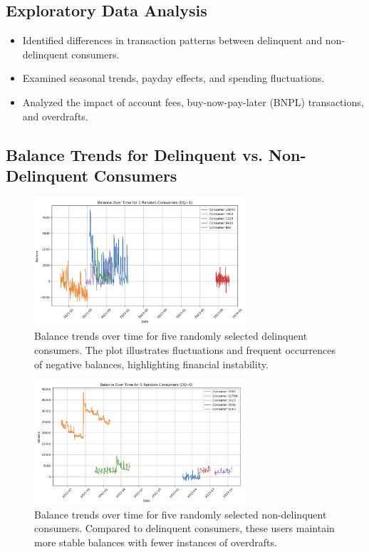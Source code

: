\documentclass[12pt,letterpaper]{article}
\begin{document}
\subsection{Exploratory Data Analysis}
\begin{itemize}
    \item Identified differences in transaction patterns between delinquent and non-delinquent consumers.
    \item Examined seasonal trends, payday effects, and spending fluctuations.
    \item Analyzed the impact of account fees, buy-now-pay-later (BNPL) transactions, and overdrafts.
\end{itemize}

\subsection{Balance Trends for Delinquent vs. Non-Delinquent Consumers}

\begin{figure}[H]
    \centering
    \includegraphics[width=0.7\textwidth]{figure/balance_delinquent.png}
    \caption{Balance trends over time for five randomly selected delinquent consumers. The plot illustrates fluctuations and frequent occurrences of negative balances, highlighting financial instability.}
    \label{fig:balance_delinquent}
\end{figure}

\begin{figure}[H]
    \centering
    \includegraphics[width=0.7\textwidth]{figure/balance_non_delinquent.png}
    \caption{Balance trends over time for five randomly selected non-delinquent consumers. Compared to delinquent consumers, these users maintain more stable balances with fewer instances of overdrafts.}
    \label{fig:balance_non_delinquent}
\end{figure}
\end{document}
